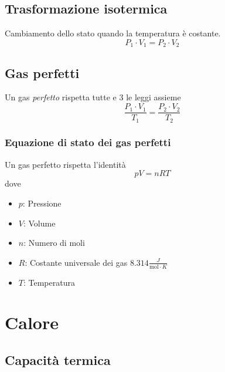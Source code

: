 \documentclass{article}
\begin{document}
\subsection{Trasformazione isotermica}

\begin{minipage}[left]{0.25\textwidth}
\end{minipage}
\begin{minipage}[left]{0.75\textwidth}
Cambiamento dello stato quando la temperatura è costante.
\[
    P_1 \cdot V_1 = P_2 \cdot V_2
\]
\end{minipage}

\subsection{Gas perfetti}

Un gas \textit{perfetto} rispetta tutte e 3 le leggi assieme
\[
    \frac{P_1 \cdot V_1}{T_1} = \frac{P_2 \cdot V_2}{T_2}
\]

\subsubsection{Equazione di stato dei gas perfetti}

Un gas perfetto rispetta l'identità
\[
    pV = nRT
\]
dove
\begin{itemize}
    \item \(p\): Pressione
    \item \(V\): Volume
    \item \(n\): Numero di moli
    \item \(R\): Costante universale dei gas \(8.314 \frac{J}{\text{mol} \cdot K}\)
    \item \(T\): Temperatura
\end{itemize}

\pagebreak

\section{Calore}

\subsection{Capacità termica}
\end{document}

